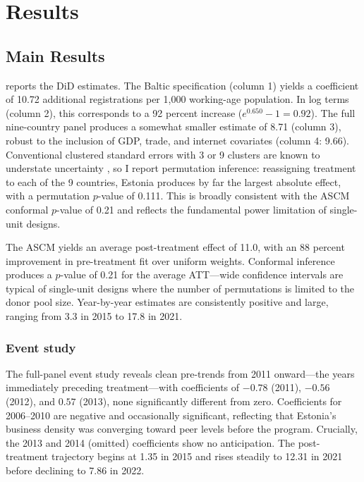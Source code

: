 \documentclass[12pt]{article}
\begin{document}
\section{Results}

\subsection{Main Results}



 reports the DiD estimates. The Baltic specification (column 1) yields a coefficient of 10.72 additional registrations per 1,000 working-age population. In log terms (column 2), this corresponds to a 92 percent increase ($e^{0.650} - 1 = 0.92$). The full nine-country panel produces a somewhat smaller estimate of 8.71 (column 3), robust to the inclusion of GDP, trade, and internet covariates (column 4: 9.66). Conventional clustered standard errors with 3 or 9 clusters are known to understate uncertainty \citep{cameron2008}, so I report permutation inference: reassigning treatment to each of the 9 countries, Estonia produces by far the largest absolute effect, with a permutation $p$-value of 0.111. This is broadly consistent with the ASCM conformal $p$-value of 0.21 and reflects the fundamental power limitation of single-unit designs.

The ASCM yields an average post-treatment effect of 11.0, with an 88 percent improvement in pre-treatment fit over uniform weights. Conformal inference produces a $p$-value of 0.21 for the average ATT---wide confidence intervals are typical of single-unit designs where the number of permutations is limited to the donor pool size. Year-by-year estimates are consistently positive and large, ranging from 3.3 in 2015 to 17.8 in 2021.

\subsubsection*{Event study} The full-panel event study reveals clean pre-trends from 2011 onward---the years immediately preceding treatment---with coefficients of $-0.78$ (2011), $-0.56$ (2012), and $0.57$ (2013), none significantly different from zero. Coefficients for 2006--2010 are negative and occasionally significant, reflecting that Estonia's business density was converging toward peer levels before the program. Crucially, the 2013 and 2014 (omitted) coefficients show no anticipation. The post-treatment trajectory begins at 1.35 in 2015 and rises steadily to 12.31 in 2021 before declining to 7.86 in 2022.
\end{document}
